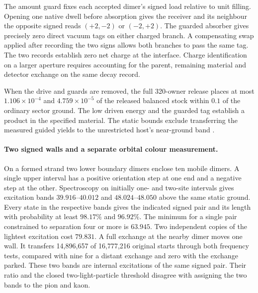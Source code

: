 The amount guard fixes each accepted dimer's signed load relative to
unit filling. Opening one native dwell before absorption gives the
receiver and its neighbour the opposite signed reads \((+2,-2)\) or
\((-2,+2)\). The guarded absorber gives precisely zero direct
vacuum tags on either charged branch. A compensating swap applied
after recording the two signs allows both branches to pass the same
tag. The two records establish zero net charge at the interface.
Charge identification on a larger aperture requires accounting for
the parent, remaining material and detector exchange on the same
decay record.

When the drive and guards are removed, the full 320-owner release
places at most \(1.106\times10^{-4}\) and \(4.759\times10^{-5}\) of
the released balanced stock within \(0.1\) of the ordinary sector
ground. The low driven energy and the guarded tag establish a product
in the specified material. The static bounds exclude transferring the
measured guided yields to the unrestricted host's near-ground band
\cite{ophmodel}.

\paragraph{Two signed walls and a separate orbital colour measurement.}
On a formed strand two lower boundary dimers enclose ten mobile dimers.
A single upper interval has a positive orientation step at one end
and a negative step at the other. Spectroscopy on initially one- and
two-site intervals gives excitation bands $39.916$--$40.012$ and
$48.024$--$48.050$ above the same static ground. Every state in the
respective bands gives the indicated signed pair and its length with
probability at least $98.17\%$ and $96.92\%$. The minimum for a single
pair constrained to separation four or more is $63.945$. Two independent
copies of the lightest excitation cost $79.831$. A full exchange at the
nearby dimer moves one wall. It transfers 14,896,657 of 16,777,216
original starts through both frequency tests, compared with nine for a
distant exchange and zero with the exchange parked. These two bands are
internal excitations of the same signed pair. Their ratio and the
closed two-light-particle threshold disagree with assigning the two
bands to the pion and kaon.

